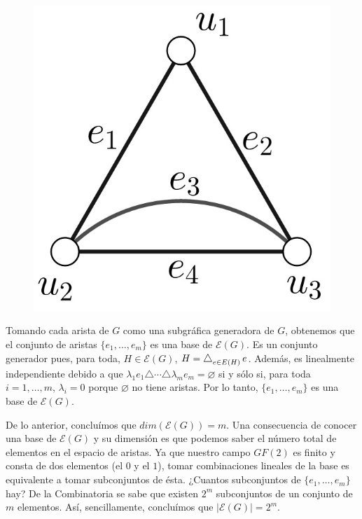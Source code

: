 \begin{figure}
    \vspace{-0.8cm}
    \centering
    \includegraphics[scale=0.3]{img/imgchapter3/grafoejemplo.jpg}
    \caption{}
    \label{fig:grafoejemplo}
    \vspace{-0.5cm}
\end{figure}

Tomando cada arista de $G$ como una subgráfica generadora de $G$, obtenemos que el conjunto de aristas $\{e_{1},\ldots, e_{m}\}$ es una base de $\mathcal{E}(G)$. Es un conjunto generador pues, para toda, $H \in \mathcal{E}(G)$, $H = \difsym_{e \in E(H)} e$. Además, es linealmente independiente debido a que $\lambda_{1}e_{1} \triangle \cdots \triangle \lambda_{m}e_{m} = \varnothing$ si y sólo si, para toda $i = 1, \ldots, m$, $\lambda_{i}=0$ porque $\varnothing$ no tiene aristas. Por lo tanto, $\{e_{1},\ldots, e_{m}\}$ es una base de $\mathcal{E}(G)$.

De lo anterior, concluímos que $dim(\mathcal{E}(G)) = m$. Una consecuencia de conocer una base de $\mathcal{E}(G)$ y su dimensión es que podemos saber el número total de elementos en el espacio de aristas. Ya que nuestro campo $GF(2)$ es finito y consta de dos elementos (el $0$ y el $1$), tomar combinaciones lineales de la base es equivalente a tomar subconjuntos de ésta. ¿Cuantos subconjuntos de $\{e_{1},\ldots, e_{m}\}$ hay? De la Combinatoria se sabe que existen $2^{m}$ subconjuntos de un conjunto de $m$ elementos. Así, sencillamente, concluímos que $|\mathcal{E}(G)| = 2^{m}$.

